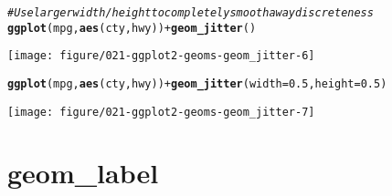 \documentclass[a4paper,titlepage]{tufte-handout}\usepackage[]{graphicx}\usepackage[]{color}
\makeatletter
\def\maxwidth{ %
  \ifdim\Gin@nat@width>\linewidth
    \linewidth
  \else
    \Gin@nat@width
  \fi
}
\newcommand{\hlnum}[1]{\textcolor[rgb]{0.686,0.059,0.569}{#1}}%
\newcommand{\hlcom}[1]{\textcolor[rgb]{0.678,0.584,0.686}{\textit{#1}}}%
\newcommand{\hlopt}[1]{\textcolor[rgb]{0,0,0}{#1}}%
\newcommand{\hlstd}[1]{\textcolor[rgb]{0.345,0.345,0.345}{#1}}%
\newcommand{\hlkwc}[1]{\textcolor[rgb]{0.333,0.667,0.333}{#1}}%
\newcommand{\hlkwd}[1]{\textcolor[rgb]{0.737,0.353,0.396}{\textbf{#1}}}%
\newenvironment{kframe}{%
 \def\at@end@of@kframe{}%
 \ifinner\ifhmode%
  \def\at@end@of@kframe{\end{minipage}}%
  \begin{minipage}{\columnwidth}%
 \fi\fi%
 \def\FrameCommand##1{\hskip\@totalleftmargin \hskip-\fboxsep
 \colorbox{shadecolor}{##1}\hskip-\fboxsep
     \hskip-\linewidth \hskip-\@totalleftmargin \hskip\columnwidth}%
 \MakeFramed {\advance\hsize-\width
   \@totalleftmargin\z@ \linewidth\hsize
   \@setminipage}}%
 {\par\unskip\endMakeFramed%
 \at@end@of@kframe}
\newenvironment{knitrout}{}{} %
\makeatother
\begin{document}
\begin{knitrout}
\begin{kframe}\begin{alltt}
\hlcom{# Use larger width/height to completely smooth away discreteness}
\hlkwd{ggplot}\hlstd{(mpg,} \hlkwd{aes}\hlstd{(cty, hwy))} \hlopt{+} \hlkwd{geom_jitter}\hlstd{()}
\end{alltt}
\end{kframe}
\texttt{[image: figure/021-ggplot2-geoms-geom\_jitter-6]} 
\begin{kframe}\begin{alltt}
\hlkwd{ggplot}\hlstd{(mpg,} \hlkwd{aes}\hlstd{(cty, hwy))} \hlopt{+} \hlkwd{geom_jitter}\hlstd{(}\hlkwc{width} \hlstd{=} \hlnum{0.5}\hlstd{,} \hlkwc{height} \hlstd{=} \hlnum{0.5}\hlstd{)}
\end{alltt}
\end{kframe}
\texttt{[image: figure/021-ggplot2-geoms-geom\_jitter-7]} 

\end{knitrout}


\section{geom\_label}
\end{document}
